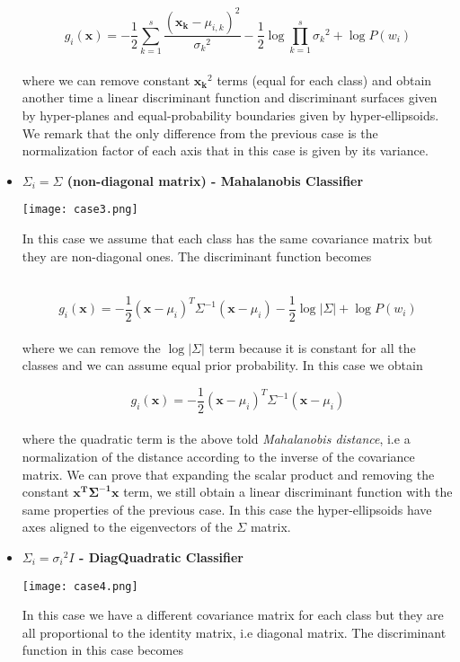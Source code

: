 \documentclass{standalone}
\begin{document}
\begin{itemize}
$$
g_i(\mathbf{x}) = -\frac{1}{2}\sum_{k=1}^{s}\frac{(\mathbf{x_k}-\mu_{i,k})^2}{{\sigma_k}^2}-\frac{1}{2}\log\prod_{k=1}^{s}{\sigma_k}^2+\log P(w_i)
$$
\\
where we can remove constant $\mathbf{x_k}^2$ terms (equal for each class) and obtain another time a linear discriminant function and discriminant surfaces given by hyper-planes and equal-probability boundaries given by hyper-ellipsoids.
We remark that the only difference from the previous case is the normalization factor of each axis that in this case is given by its variance.


\item \textbf{$\Sigma_i = \Sigma$ (non-diagonal matrix) - Mahalanobis Classifier}

\begin{minipage}{.30\textwidth}
\hspace{-.5cm}
\texttt{[image: case3.png]}
\end{minipage}%
\begin{minipage}{.70\textwidth}
In this case we assume that each class has the same covariance matrix but they are non-diagonal ones.
The discriminant function becomes
\end{minipage}\\

$$
g_i(\mathbf{x}) = -\frac{1}{2}(\mathbf{x}-\mu_i)^T{\Sigma}^{-1}(\mathbf{x}-\mu_i) -\frac{1}{2}\log\left|\Sigma\right|+\log P(w_i)
$$
\\
where we can remove the $\log\left|\Sigma\right|$ term because it is constant for all the classes and we can assume equal prior probability.
In this case we obtain

$$
g_i(\mathbf{x}) = -\frac{1}{2}(\mathbf{x}-\mu_i)^T{\Sigma}^{-1}(\mathbf{x}-\mu_i)
$$
\\
where the quadratic term is the above told \emph{Mahalanobis distance}, i.e a normalization of the distance according to the inverse of the covariance matrix.
We can prove that expanding the scalar product and removing the constant $\mathbf{x^T\Sigma^{-1}x}$ term, we still obtain a linear discriminant function with the same properties of the previous case.
In this case the hyper-ellipsoids have axes aligned to the eigenvectors of the $\Sigma$ matrix.


\item \textbf{$\Sigma_i = {\sigma_i}^2I$ - DiagQuadratic Classifier}

\begin{minipage}{.30\textwidth}
\hspace{-.5cm}
\texttt{[image: case4.png]}
\end{minipage}%
\begin{minipage}{.70\textwidth}
In this case we have a different covariance matrix for each class but they are all proportional to the identity matrix, i.e diagonal matrix.
The discriminant function in this case becomes
\end{minipage}\\


\end{itemize}
\end{document}

